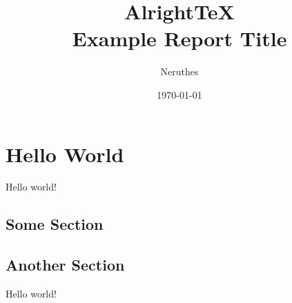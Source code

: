 \documentclass[11pt,a4paper]{report}
\title{AlrightTeX\\Example Report Title}
\author{Neruthes}
\date{\today}
\begin{document}
\maketitlecover

\tableofcontents


\chapter{Hello World}
Hello world!

\section{Some Section}
\lipsum[1-3][1-5]

\section{Another Section}
Hello world!

\lipsum[1-3][1-5]
\end{document}
